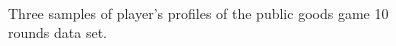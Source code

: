 \begin{figure}[!h]
    \hfill{\begin{minipage}{\dimexpr \textwidth-2\fboxsep-2\fboxrule}%
            \centering
            \\
            \\
            \\
        \end{minipage}}
        \caption{Three samples of player's profiles of the public goods game 10 rounds data set.}
        \label{fig:playersProfiles}
    \end{figure}




